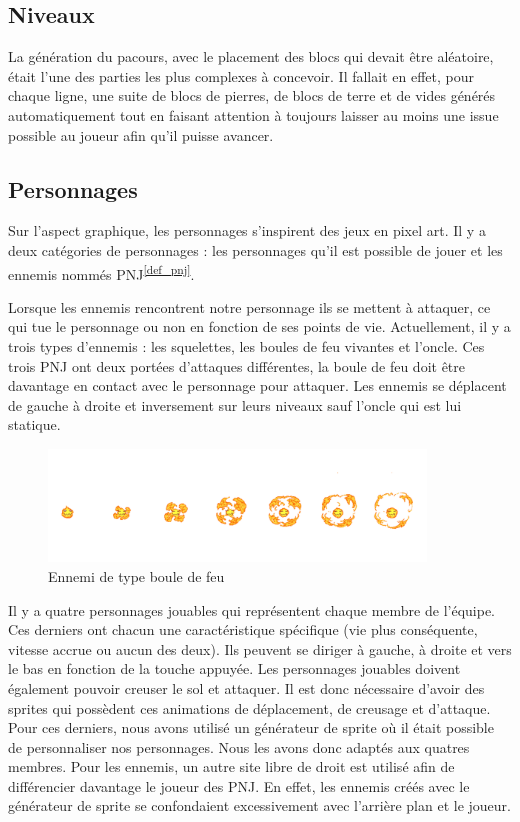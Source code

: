 \documentclass[a4paper,12pt]{article}
\newcommand\refsuscrite[1]{\textsuperscript{\ref{#1}}}
\begin{document}
\subsection{Niveaux}
La génération du pacours, avec le placement des blocs qui devait être aléatoire, était l'une des parties les plus complexes à concevoir.
Il fallait en effet, pour chaque ligne, une suite de blocs de pierres, de blocs de terre et de vides générés automatiquement tout en faisant attention à toujours laisser au moins une issue possible au joueur afin qu'il puisse avancer.

\subsection{Personnages}
Sur l’aspect graphique, les personnages s’inspirent des jeux en pixel art. 
Il y a deux catégories de personnages : les personnages qu’il est possible de jouer et les ennemis nommés PNJ\refsuscrite{def_pnj}.

Lorsque les ennemis rencontrent notre personnage ils se mettent à attaquer, ce qui tue le personnage ou non en fonction de ses points de vie. 
Actuellement, il y a trois types d’ennemis : les squelettes, les boules de feu vivantes et l'oncle. 
Ces trois PNJ ont deux portées d’attaques différentes, la boule de feu doit être davantage en contact avec le personnage pour attaquer.
Les ennemis se déplacent de gauche à droite et inversement sur leurs niveaux sauf l'oncle qui est lui statique. 

\begin{figure}[h]
	\centering
	\includegraphics[height=3cm]{img/exemple_feu.png}
	\caption{Ennemi de type boule de feu}
	\label{boule de feu}
\end{figure}

Il y a quatre personnages jouables qui représentent chaque membre de l’équipe. 
Ces derniers ont chacun une caractéristique spécifique (vie plus conséquente, vitesse accrue ou aucun des deux). 
Ils peuvent se diriger à gauche, à droite et vers le bas en fonction de la touche appuyée. 
Les personnages jouables doivent également pouvoir creuser le sol et attaquer. Il est donc nécessaire d’avoir des sprites qui possèdent ces animations de déplacement, de creusage et d'attaque.
Pour ces derniers, nous avons utilisé un générateur de sprite où il était possible de personnaliser nos personnages. Nous les avons donc adaptés aux quatres membres. 
Pour les ennemis, un autre site libre de droit est utilisé afin de différencier davantage le joueur des PNJ. En effet, les ennemis créés avec le générateur de sprite se confondaient excessivement avec l'arrière plan et le joueur.
\end{document}
